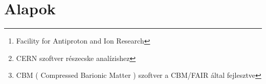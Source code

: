 \documentclass[a4paper,12pt]{article}
\begin{document}
\renewcommand{\abstractname}{Kivonat}
\renewcommand{\thesection}{\Roman{section}.}
\renewcommand{\thesubsection}{\thesection\arabic{subsection}}
\renewcommand{\thesubsubsection}{\thesubsection\arabic{subsubsection}}

\begin{abstract}
	\par Egy hónapot töltöttem a nyár folyamán, július hónapba, Darmstadtban a GSI nevű kutatóközpontban. Kint tartózkodásom célja az volt, hogy többet megtudjak a  CBM saját szimulációjáról, amely kutató csoport már az
	 épülő FAIR\footnote{ Facility for Antiproton and Ion Research } része. Ezalatt a hónap alatt megismerkedtem mélyebben a ROOT \footnote{ CERN szoftver részecske analízishez} nevű szoftverrel, a
	  helyi cbmROOT-tal \footnote{ CBM ( Compressed Barionic Matter  ) szoftver a CBM/FAIR által fejlesztve}, valamint a C és C++ programozási nyelvekkel.
	\vspace{5mm}
	\par A kint létem alatt sokat tanultam a detektor technológiákról, valamint az azokban lejátszódó eseményekről.
	\vspace{5mm}
	\par Itthoni munkám során a nehézion ütközések szimulációjához kapcsolódva egy klaszterező program fejlesztésével foglalkoztam, 
	ami a kinyert adatokat csoportosítja térbeli és impulzustérbeli távolságuk alapján, előre definiált klaszterezési mérettel, az MST algoritmus felhasználása segítségével.
\end{abstract}
\tableofcontents
\section{ Alapok}
\end{document}
